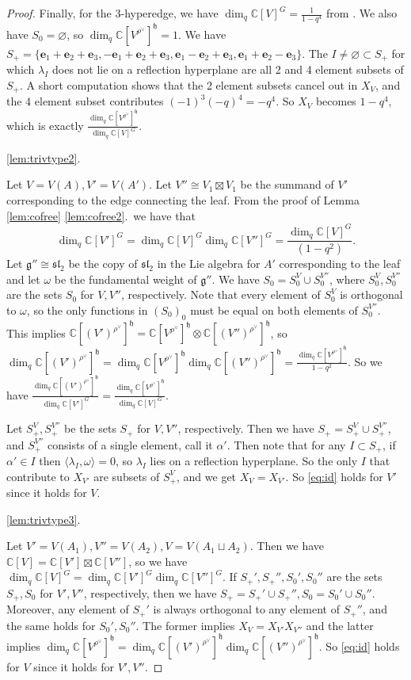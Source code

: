 \documentclass[12pt]{article}
\renewcommand{\b}[1]{\textbf{#1}}
\newcommand{\C}{\mathbb{C}}
\renewcommand{\sl}{\mathfrak{sl}}
\theoremstyle{definition}
\theoremstyle{remark}
\newcommand{\g}{\mathfrak{g}}
\newcommand{\h}{\mathfrak{h}}
\begin{document}
\begin{proof}
Finally, for the $3$-hyperedge, we have $\dim_q\C[V]^G=\frac{1}{1-q^4}$ from \cite{littelmann}. We also have $S_0=\varnothing$, so $\dim_q\C[V^{\rho^\vee}]^\h=1$. We have $S_+=\{\b{e}_1+\b{e}_2+\b{e}_3,-\b{e}_1+\b{e}_2+\b{e}_3,\b{e}_1-\b{e}_2+\b{e}_3,\b{e}_1+\b{e}_2-\b{e}_3\}$. The $I\neq \varnothing\subset S_+$ for which $\lambda_I$ does not lie on a reflection hyperplane are all 2 and 4 element subsets of $S_+$. A short computation shows that the 2 element subsets cancel out in $X_V$, and the 4 element subset contributes $(-1)^3(-q)^4=-q^4$. So $X_V$ becomes $1-q^4$, which is exactly $\frac{\dim_q\C[V^{\rho^\vee}]^\h}{\dim_q\C[V]^G}$.

\ref{lem:trivtype2}.

Let $V=V(A),V'=V(A')$. Let $V''\cong V_1\boxtimes V_1$ be the summand of $V'$ corresponding to the edge connecting the leaf. From the proof of Lemma \ref{lem:cofree} \ref{lem:cofree2}.~we have that 
\begin{equation*}
\dim_q\C[V']^G=\dim_q\C[V]^G\dim_q\C[V'']^G=\frac{\dim_q\C[V]^G}{(1-q^2)}.
\end{equation*}
Let $\g''\cong\sl_2$ be the copy of $\sl_2$ in the Lie algebra for $A'$ corresponding to the leaf and let $\omega$ be the fundamental weight of $\g''$. We have $S_0=S_0^V\cup S_0^{V''}$, where $S_0^V,S_0^{V''}$ are the sets $S_0$ for $V,V''$, respectively. Note that every element of $S_0^V$ is orthogonal to $\omega$, so the only functions in $(S_0)_0$ must be equal on both elements of $S_0^{V''}$. This implies $\C[(V')^{\rho^\vee}]^\h=\C[V^{\rho^\vee}]^\h\otimes\C[(V'')^{\rho^\vee}]^\h$, so $\dim_q\C[(V')^{\rho^\vee}]^\h=\dim_q\C[V^{\rho^\vee}]^\h\dim_q\C[(V'')^{\rho^\vee}]^\h=\frac{\dim_q\C[V^{\rho^\vee}]^\h}{1-q^2}$. So we have $\frac{\dim_q\C[(V')^{\rho^\vee}]^\h}{\dim_q\C[V']^G}=\frac{\dim_q\C[V^{\rho^\vee}]^\h}{\dim_q\C[V]^G}$.

Let $S_+^V,S_+^{V''}$ be the sets $S_+$ for $V,V''$, respectively. Then we have $S_+=S_+^V\cup S_+^{V''}$, and $S_+^{V''}$ consists of a single element, call it $\alpha'$. Then note that for any $I\subset S_+$, if $\alpha'\in I$ then $\langle\lambda_I,\omega\rangle=0$, so $\lambda_I$ lies on a reflection hyperplane. So the only $I$ that contribute to $X_{V'}$ are subsets of $S_+^V$, and we get $X_V=X_{V'}$. So \eqref{eq:id} holds for $V'$ since it holds for $V$.

\ref{lem:trivtype3}.

Let $V'=V(A_1),V''=V(A_2),V=V(A_1\sqcup A_2)$. Then we have $\C[V]=\C[V']\boxtimes\C[V'']$, so we have $\dim_q\C[V]^G=\dim_q\C[V']^G\dim_q\C[V'']^G$. If $S_+',S_+'',S_0',S_0''$ are the sets $S_+,S_0$ for $V',V''$, respectively, then we have $S_+=S_+'\cup S_+'',S_0=S_0'\cup S_0''$. Moreover, any element of $S_+'$ is always orthogonal to any element of $S_+''$, and the same holds for $S_0',S_0''$. The former implies $X_V=X_{V'}X_{V''}$ and the latter implies $\dim_q\C[V^{\rho^\vee}]^\h=\dim_q\C[(V')^{\rho^\vee}]^\h\dim_q\C[(V'')^{\rho^\vee}]^\h$. So \eqref{eq:id} holds for $V$ since it holds for $V',V''$.
    
\end{proof}
\end{document}
